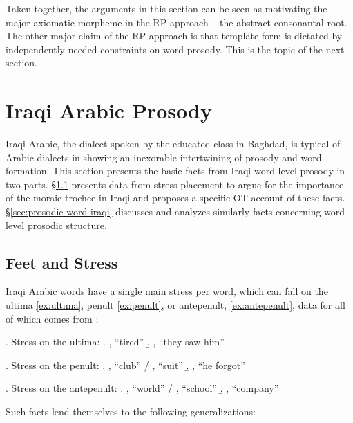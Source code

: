 \documentclass[12pt,twoside,letterpaper]{article}
\begin{document}
Taken together, the arguments in this section can be seen as motivating the major axiomatic morpheme in the RP approach -- the abstract consonantal root. The other major claim of the RP approach is that template form is dictated by independently-needed constraints on word-prosody. This is the topic of the next section.

\section{Iraqi Arabic Prosody}
\label{sec:iraqi-arabic-prosody}

Iraqi Arabic, the dialect spoken by the educated class in Baghdad, is typical of Arabic dialects in showing an inexorable intertwining of prosody and word formation. This section presents the basic facts from Iraqi word-level prosody in two parts. \S{\ref{sec:feet-stress}} presents data from stress placement to argue for the importance of the moraic trochee in Iraqi and proposes a specific OT account of these facts. \S{\ref{sec:prosodic-word-iraqi}} discusses and analyzes similarly facts concerning word-level prosodic structure.

\subsection{Feet and Stress}
\label{sec:feet-stress}

Iraqi Arabic words have a single main stress per word, which can fall on the ultima \ref{ex:ultima}, penult \ref{ex:penult}, or antepenult, \ref{ex:antepenult}, data for all of which comes from \cite[pp.40--1]{erwin04}:

\ex. \label{ex:ultima}Stress on the ultima:
\a. \label{ex:stress-cvcc} , ``tired''
\b. \label{ex:stress-cvv} , ``they saw him''

\ex. \label{ex:penult}Stress on the penult:
\a. \label{ex:stress-heavy-penult} , ``club'' / , ``suit''
\b. \label{ex:stress-two-syllables} , ``he forgot''

\ex. \label{ex:antepenult} Stress on the antepenult:
\a. \label{ex:stress-heavy-ante} , ``world'' / , ``school''
\b. \label{ex:cvcvcv} , ``company''

Such facts lend themselves to the following generalizations:
\end{document}
